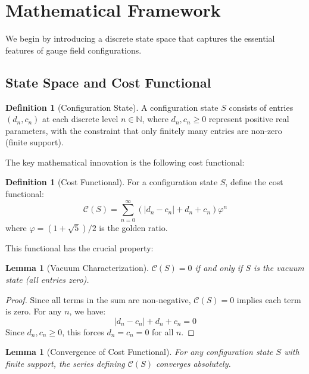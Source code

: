 \documentclass[11pt]{article}
\numberwithin{equation}{section}
\newtheorem{lemma}[theorem]{Lemma}
\theoremstyle{definition}
\newtheorem{definition}[theorem]{Definition}
\theoremstyle{remark}
\begin{document}
\section{Mathematical Framework}
\label{sec:framework}

We begin by introducing a discrete state space that captures the essential features of gauge field configurations.

\subsection{State Space and Cost Functional}

\begin{definition}[Configuration State]
A configuration state $S$ consists of entries $(d_n, c_n)$ at each discrete level $n \in \mathbb{N}$, where $d_n, c_n \geq 0$ represent positive real parameters, with the constraint that only finitely many entries are non-zero (finite support).
\end{definition}

The key mathematical innovation is the following cost functional:

\begin{definition}[Cost Functional]
For a configuration state $S$, define the cost functional:
\begin{equation}
\mathcal{C}(S) = \sum_{n=0}^{\infty} \left(|d_n - c_n| + d_n + c_n\right) \varphi^n
\end{equation}
where $\varphi = (1+\sqrt{5})/2$ is the golden ratio.
\end{definition}

This functional has the crucial property:

\begin{lemma}[Vacuum Characterization]
\label{lem:vacuum}
$\mathcal{C}(S) = 0$ if and only if $S$ is the vacuum state (all entries zero).
\end{lemma}

\begin{proof}
Since all terms in the sum are non-negative, $\mathcal{C}(S) = 0$ implies each term is zero. For any $n$, we have:
\[|d_n - c_n| + d_n + c_n = 0\]
Since $d_n, c_n \geq 0$, this forces $d_n = c_n = 0$ for all $n$.
\end{proof}

\begin{lemma}[Convergence of Cost Functional]
For any configuration state $S$ with finite support, the series defining $\mathcal{C}(S)$ converges absolutely.
\end{lemma}
\end{document}
